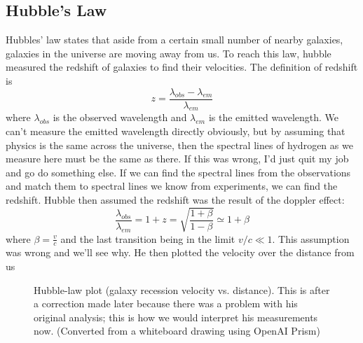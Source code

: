 \subsection{Hubble's Law}
Hubbles' law states that aside from a certain small number of nearby galaxies, galaxies in the universe are moving away from us. To reach this law, hubble measured the redshift of galaxies to find their velocities. The definition of redshift is
\begin{equation}
  z = \frac{\lambda_{obs}-\lambda_{em}}{\lambda_{em}}
\end{equation}
where \(\lambda_{obs}\) is the observed wavelength and \(\lambda_{em}\) is the emitted wavelength. We can't measure the emitted wavelength directly obviously, but by assuming that physics is the same across the universe, then the spectral lines of hydrogen as we measure here must be the same as there. If this was wrong, I'd just quit my job and go do something else. If we can find the spectral lines from the observations and match them to spectral lines we know from experiments, we can find the redshift. Hubble then assumed the redshift was the result of the doppler effect:
\begin{equation}
  \frac{\lambda_{obs}}{\lambda_{em}} = 1+z = \sqrt{\frac{1+\beta}{1-\beta}} \simeq 1+ \beta
\end{equation}
where \(\beta = \frac{v}{c}\) and the last transition being in the limit \(v/c \ll 1\). This assumption was wrong and we'll see why. He then plotted the velocity over the distance from us
\begin{figure}[!htb]
    \centering
    \caption{Hubble-law plot (galaxy recession velocity vs. distance). This is after a correction made later because there was a problem with his original analysis; this is how we would interpret his measurements now. (Converted from a whiteboard drawing using OpenAI Prism)}
\end{figure}
